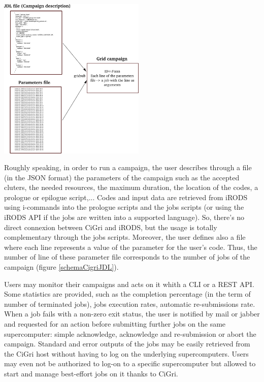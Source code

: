 \documentclass[a4paper, 10pt]{article}
\begin{document}
\begin{multicols}{2}
\begin{center}%
\centering
{}
\includegraphics[width=7cm]{cigri_sub.png}
\end{center}


Roughly speaking, in order to run a campaign, the user describes through a file (in the JSON format) the parameters of the campaign 
such as the accepted cluters, the needed resources, the maximum duration, the location of the codes, a prologue or epilogue script,...  
Codes and input data are retrieved from iRODS using i-commands into the prologue scripts and the jobs scripts (or using the iRODS API if the jobs are written into a supported language). So, there's no direct connexion between CiGri and iRODS, but the usage is totally complementary through the jobs scripts. 
Moreover, the user defines also a file where each line represents a value of the parameter for the user's code.
Thus, the number of line of these parameter file corresponds to the number of jobs of the campaign (figure \ref{schemaCigriJDL}).

Users may monitor their campaigns and acts on it whith a CLI or a REST API. Some statistics are provided, such as the completion percentage (in the term of number of terminated jobs), jobs execution rates, automatic re-submissions rate. When a job fails with a non-zero exit status, the user is notified by mail or jabber and requested for an action before submitting further jobs on the same supercomputer: simple acknowledge, acknowledge and re-submission or abort the campaign. Standard and error outputs of the jobs may be easily retrieved from the CiGri host without having to log on the underlying supercomputers. Users may even not be authorized to log-on to a specific supercomputer but allowed to start and manage best-effort jobs on it thanks to CiGri.


\end{multicols}
\end{document}
